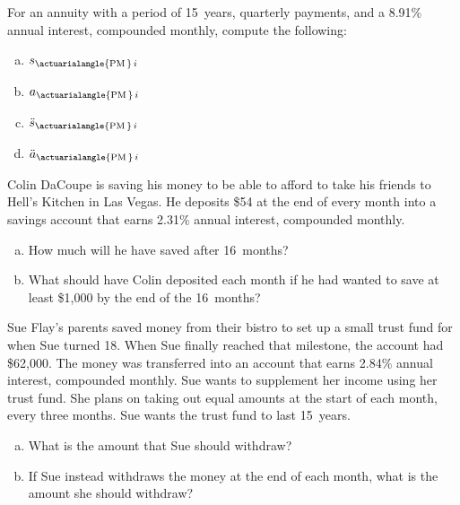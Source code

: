 \documentclass[11pt,letterpaper]{article}
\begin{document}

 For an annuity with a period of 15~years, quarterly payments, and a 8.91\% annual interest, compounded monthly, compute the following:
	\begin{enumerate}[(a)]
	\item $s_{\actuarialangle{\text{PM}\,}\, i}$
	\item $a_{\actuarialangle{\text{PM}\,}\, i}$
	\item $\ddot{s}_{\actuarialangle{\text{PM}\,}\, i}$
	\item $\ddot{a}_{\actuarialangle{\text{PM}\,}\, i}$
	\end{enumerate}



\newpage



 Colin DaCoupe is saving his money to be able to afford to take his friends to Hell's Kitchen in Las Vegas. He deposits \$54 at the end of every month into a savings account that earns 2.31\% annual interest, compounded monthly. 
	\begin{enumerate}[(a)]
	\item How much will he have saved after 16~months?
	\item What should have Colin deposited each month if he had wanted to save at least \$1,000 by the end of the 16~months?
	\end{enumerate}



\newpage



 Sue Flay's parents saved money from their bistro to set up a small trust fund for when Sue turned 18. When Sue finally reached that milestone, the account had \$62,000. The money was transferred into an account that earns 2.84\% annual interest, compounded monthly. Sue wants to supplement her income using her trust fund. She plans on taking out equal amounts at the start of each month, every three months. Sue wants the trust fund to last 15~years. 
	\begin{enumerate}[(a)]
	\item  What is the amount that Sue should withdraw?
	\item If Sue instead withdraws the money at the end of each month, what is the amount she should withdraw? 
	\end{enumerate}
\end{document}

